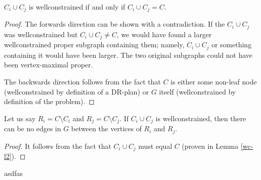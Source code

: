 \documentclass[11pt]{article}
\begin{document}
\begin{lemma}\label{wc-l2}
$C_i\cup C_j$ is wellconstrained if and only if $C_i\cup C_j = C$.
\end{lemma}

\begin{proof}
The forwards direction can be shown with a contradiction. If the $C_i\cup C_j$ was wellconstrained but $C_i\cup C_j \neq C$, we would have found a larger wellconstrained proper subgraph containing them; namely, $C_i\cup C_j$ or something containing it would have been larger. The two original subgraphs could not have been vertex-maximal proper.

The backwards direction follows from the fact that $C$ is either some non-leaf node (wellconstrained by definition of a DR-plan) or $G$ itself (wellconstrained by definition of the problem).
\end{proof}

\begin{corollary}\label{wc-c1}
Let us say $R_i=C\setminus C_i$ and $R_j=C\setminus C_j$. If $C_i\cup C_j$ is wellconstrained, then there can be no edges in $G$ between the vertices of $R_i$ and $R_j$.
\end{corollary}

\begin{proof}
It follows from the fact that $C_i\cup C_j$ must equal $C$ (proven in Lemma \ref{wc-l2}).
\end{proof}





\begin{lemma}
asdfas
\end{lemma}
\end{document}
